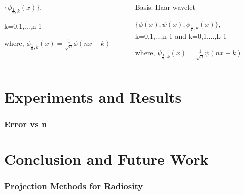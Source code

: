 \begin{frame}
\begin{columns}[T]
\begin{column}{.5\textwidth}
                 \centering
                  $\{  \phi_{\frac{1}{n},k}(x)\}$,\\
        \vspace{0.2cm}

                   k=0,1,...,n-1\\
        \vspace{0.5cm}

                  where, 
                  $\phi_{\frac{1}{n},k}(x)=\frac{1}{\sqrt{n}}\phi(nx-k)$

        \end{column}
        \begin{column}{.5\textwidth}
                 Basis: Haar wavelet 

            \vspace{0.5cm}

                 \centering
                  $\{ \phi(x),\psi(x), \phi_{\frac{1}{L},k}(x)\}$,\\ \vspace{0.2cm}
                   k=0,1,...,n-1 and k=0,1,...,L-1\\
        \vspace{0.5cm}
                  
                  where, 
                  $\psi_{\frac{1}{n},k}(x)=\frac{1}{\sqrt{n}}\psi(nx-k)$

        \end{column}
      \end{columns}

    \end{frame}


\section{Experiments and Results}

    \begin{frame}\frametitle{Error vs n}
      
    \end{frame}







\section{Conclusion and Future Work}

    \begin{frame}\frametitle{Projection Methods for Radiosity}
      
    \end{frame}

